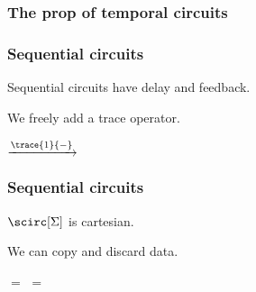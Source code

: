\begin{frame}
    \frametitle{The prop of temporal circuits}
    
    \begin{center}
    \end{center}

\end{frame}
\begin{frame}
    \frametitle{Sequential circuits}

    \pause

    Sequential circuits have delay and \alert{feedback}.
    
    \pause

    We freely add a \alert{trace operator}.

    \pause

    \begin{center}
        \quad$\xrightarrow{\trace{1}{-}}$\quad
    \end{center}        

    \pause

    \vspace{1.5em}

    \begin{center}
    \end{center}

\end{frame}
\begin{frame}
    \frametitle{Sequential circuits}

    \pause

    \begin{theorem}
        $\scirc[\Sigma]$ is cartesian.
    \end{theorem}
    \pause
    We can \alert{copy} and \alert{discard} data.
    \pause
    \begin{center}
        \pause
        \quad$=$\quad
        \quad\quad
        \pause
        \pause
        \quad$=$\quad
    \end{center}

\end{frame}

